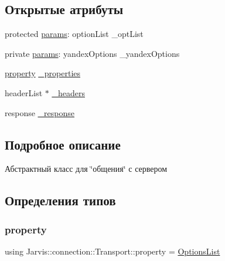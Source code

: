 \subsection*{Открытые атрибуты}
\begin{DoxyCompactItemize}
\item 
protected \hyperlink{classJarvis_1_1connection_1_1Transport_ab70d89176c8abee3eb780fab5ab5dc63}{params}\+: option\+List \+\_\+opt\+List
\item 
private \hyperlink{classJarvis_1_1connection_1_1Transport_ad7b0a1aeb169584cbdc046b3ac613819}{params}\+: yandex\+Options \+\_\+yandex\+Options
\item 
\hyperlink{classJarvis_1_1connection_1_1Transport_a81b1e5dc6c0a246fa2a225a1ff185b95}{property} \hyperlink{classJarvis_1_1connection_1_1Transport_aff80004ef5bbfa118bc9388c04124df2}{\+\_\+properties}
\item 
header\+List $\ast$ \hyperlink{classJarvis_1_1connection_1_1Transport_aa28ff148972b44b6dc6a1523d674e9d3}{\+\_\+headers}
\item 
response \hyperlink{classJarvis_1_1connection_1_1Transport_afb6094003e40fda2f269d68b5ecdc7d2}{\+\_\+response}
\end{DoxyCompactItemize}


\subsection{Подробное описание}
Абстрактный класс для \char`\"{}общения\char`\"{} с сервером 

\subsection{Определения типов}
\mbox{\label{classJarvis_1_1connection_1_1Transport_a81b1e5dc6c0a246fa2a225a1ff185b95}} 
\subsubsection{\texorpdfstring{property}{property}}
{\footnotesize\ttfamily using Jarvis\+::connection\+::\+Transport\+::property =  \hyperlink{classJarvis_1_1connection_1_1Transport_a2cb5e9e28fa84404e8b002c65fe8ecd0}{Options\+List}}



